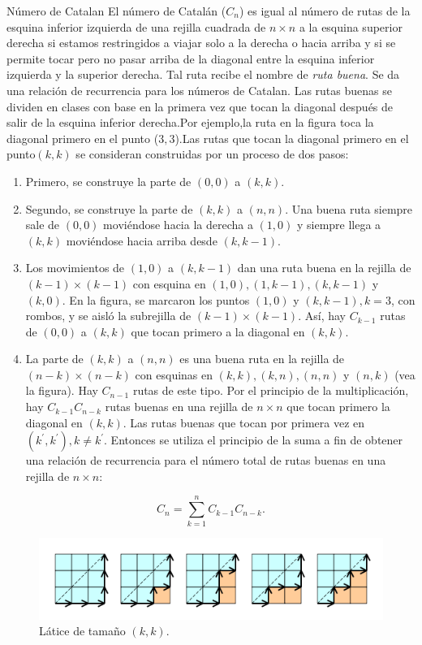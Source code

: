\begin{example}{Número de Catalan}
	El número de Catalán ($C_{n} $) es igual al número de rutas de la esquina inferior izquierda de una rejilla cuadrada de $n\times n$ a la esquina superior derecha si estamos restringidos a viajar solo a la derecha o hacia arriba y si se permite tocar pero no pasar arriba de la diagonal entre la esquina inferior izquierda y la superior derecha. Tal ruta recibe el nombre de \emph{ruta buena}. Se da una relación de recurrencia para los números de Catalan. Las rutas buenas se dividen en clases con base en  la primera vez que tocan la diagonal después de salir de la esquina inferior derecha.Por ejemplo,la ruta en la figura toca la diagonal primero en el punto ($3,3$).Las rutas que tocan la diagonal primero en el punto$(k,k)$ se consideran construidas por un proceso de dos pasos:
	\begin{enumerate}
		\item Primero, se construye la parte de $(0,0)$ a $(k,k)$.
		\item Segundo, se construye la parte de $(k,k)$ a $(n,n)$. Una buena ruta siempre sale de $(0,0)$ moviéndose hacia la derecha a $(1,0)$ y siempre llega a $(k,k)$ moviéndose hacia arriba desde $(k,k-1)$.
		\item Los movimientos de $(1,0)$ a $(k,k-1)$ dan una ruta buena en la rejilla de $(k-1)\times(k-1) $ con esquina en $ (1,0),(1,k-1),(k,k-1)$ y $ (k,0)$. En la figura, se marcaron los puntos $(1,0)$ y $(k,k-1),k=3$, con rombos, y se aisló la subrejilla de $(k-1)\times(k-1)$. Así, hay $C_{k-1}$ rutas de $(0,0)$ a $(k,k)$ que tocan primero a la diagonal en $(k,k)$.
		\item La parte de $(k,k)$ a $(n,n)$ es una buena ruta en la rejilla de $(n-k)\times(n-k)$ con esquinas en $(k,k),(k,n),(n,n)$ y $(n,k)$ (vea la figura). Hay $C_{n-1}$ rutas de este tipo. Por el principio de la multiplicación, hay $C_{k-1}C_{n-k}$ rutas buenas en una rejilla de $n\times n$ que tocan primero la diagonal en $(k,k)$. Las rutas buenas que tocan por primera vez en $(k^{\prime}, k^{\prime}),k\neq k^{\prime}$. Entonces se utiliza el principio de la suma a fin de obtener una relación de recurrencia para el número total de rutas buenas en una rejilla de $n\times n$:
	\end{enumerate}
	\[ C_{n}=\sum_{k=1}^{n}C_{k-1}C_{n-k}. \]
	\begin{figure}[ht!]
		\sidecaption[t]%
		\centering
		\includegraphics[width=0.4\paperwidth]{./img/catalan.png}
		\caption{\label{fig:hanoi} Látice de tamaño $\left(k,k\right)$.}
	\end{figure}
\end{example}


